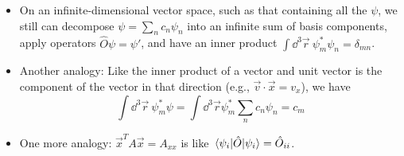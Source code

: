 \documentclass[../notes.tex]{subfiles}
\begin{document}
\begin{itemize}
\begin{itemize}
        \item On an infinite-dimensional vector space, such as that containing all the $\psi$, we still can decompose $\psi=\sum_nc_n\psi_n$ into an infinite sum of basis components, apply operators $\hat{O}\psi=\psi'$, and have an inner product $\int\dd^3\vec{r}\ \psi^*_m\psi_n=\delta_{mn}$.
        \item Another analogy: Like the inner product of a vector and unit vector is the component of the vector in that direction (e.g., $\vec{v}\cdot\vec{x}=v_x$), we have
        \begin{equation*}
            \int\dd^3\vec{r}\ \psi_m^*\psi = \int\dd^3\vec{r}\psi_m^*\sum_nc_n\psi_n = c_m
        \end{equation*}
        \item One more analogy: $\vec{x}^TA\vec{x}=A_{xx}$ is like $\ev{\hat{O}}{\psi_i}=\hat{O}_{ii}$.
    \end{itemize}
\end{itemize}
\end{document}
